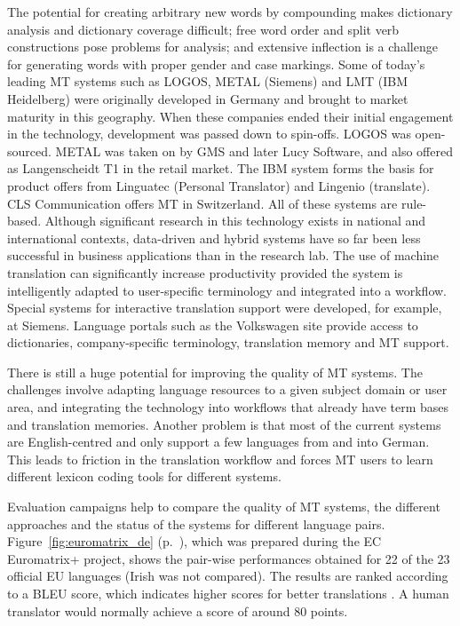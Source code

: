 \documentclass[]{../../metanetpaper}
\begin{document}
\begin{multicols}{2}

The potential for creating arbitrary new words by compounding makes dictionary analysis and dictionary coverage difficult; free word order and split verb constructions pose problems for analysis; and extensive inflection is a challenge for generating words with proper gender and case markings.  Some of today's leading MT systems such as LOGOS, METAL (Siemens) and LMT (IBM Heidelberg) were originally developed in Germany and brought to market maturity in this geography. When these companies ended their initial engagement in the technology, development was passed down to spin-offs. LOGOS was open-sourced. METAL was taken on by GMS and later Lucy Software, and also offered as Langenscheidt T1 in the retail market. The IBM system forms the basis for product offers from Linguatec (Personal Translator) and Lingenio (translate). CLS Communication offers MT in Switzerland. All of these systems are rule-based. Although significant research in this technology exists in national and international contexts, data-driven and hybrid systems have so far been less successful in business applications than in the research lab.  The use of machine translation can significantly increase productivity provided the system is intelligently adapted to user-specific terminology and integrated into a workflow. Special systems for interactive translation support were developed, for example, at Siemens. Language portals such as the Volkswagen site provide access to dictionaries, company-specific terminology, translation memory and MT support.

There is still a huge potential for improving the quality of MT systems. The challenges involve adapting language resources to a given subject domain or user area, and integrating the technology into workflows that already have term bases and translation memories. Another problem is that most of the current systems are English-centred and only support a few languages from and into German. This leads to friction in the translation workflow and forces MT users to learn different lexicon coding tools for different systems.

Evaluation campaigns help to compare the quality of MT systems, the different approaches and the status of the systems for different language pairs. Figure~\ref{fig:euromatrix_de} (p.~\pageref{fig:euromatrix_de}), which was prepared during the EC Euromatrix+ project, shows the pair-wise performances obtained for 22 of the 23 official EU languages (Irish was not compared). The results are ranked according to a BLEU score, which indicates higher scores for better translations \cite{bleu1}. A human translator would normally achieve a score of around 80 points.


\end{multicols}
\end{document}
